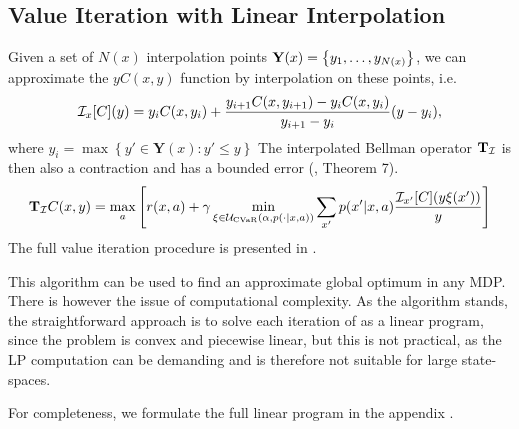 \subsection{Value Iteration with Linear Interpolation}

Given a set of $N(x)$ interpolation points $\mathbf{Y}(x) = \left\{ {y_1, \dots, y_{N(x)}} \right\}$, we can approximate the $yC(x,y)$ function by interpolation on these points, i.e.
%
\begin{equation*}
\mathcal{I}_{x}[C](y)=y_iC(x,y_{i})+\frac{y_{i+1}C(x,y_{i+1})-y_iC(x,y_{i})}{y_{i+1}-y_i}(y-y_i),
\end{equation*}
%
where $y_i = \max \left\{y'\in \mathbf{Y}(x) : y' \leq y\right\}$
The interpolated Bellman operator $\mathbf{T}_{\mathcal{I}}$ is then also a contraction and has a bounded error (\citep{chow2015risk}, Theorem 7). 
%
\begin{equation}\label{eqn:linearbellman}
\mathbf{T}_{\mathcal{I}} C(x, y) = \max_a \left[ { r(x, a) + \gamma \min_{\xi \in \mathcal{U}_{\text{CVaR}}(\alpha, p(\cdot | x, a))} \sum_{x'} p(x'| x, a)\dfrac{\mathcal{I}_{x'} [C](y\xi(x'))}{y}} \right]
\end{equation}
%
The full value iteration procedure is presented in . 

This algorithm can be used to find an approximate global optimum in any MDP. There is however the issue of computational complexity. As the algorithm stands, the straightforward approach is to solve each iteration of  as a linear program, since the problem is convex and piecewise linear, but this is not practical, as the LP computation can be demanding and is therefore not suitable for large state-spaces.

For completeness, we formulate the full linear program in the appendix .


